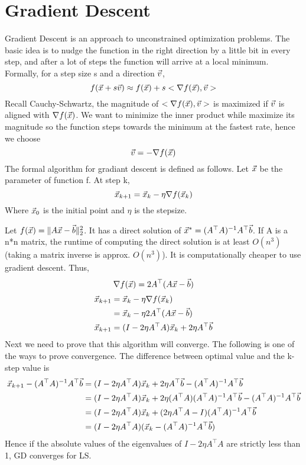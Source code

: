 \section{Gradient Descent} %
\label{sec:gradient_descent}

\begin{definition}
	Gradient Descent is an approach to unconstrained optimization problems. The basic idea is to nudge the function in the right direction by a little bit in every step, and after a lot of steps the function will arrive at a local minimum. Formally, for a step size s and a direction $\vec{v}$,
	\[
f(\vec{x}+s\vec{v}) \approx f(\vec{x})+s<\nabla f(\vec{x}), \vec{v}>
	\]
	Recall Cauchy-Schwartz, the magnitude of $<\nabla f(\vec{x}), \vec{v}>$ is maximized if $\vec{v}$ is aligned with $\nabla f(\vec{x})$. We want to minimize the inner product while maximize its magnitude so the function steps towards the minimum at the fastest rate, hence we choose
	\[
\vec{v} = -\nabla f(\vec{x})
	\]
	The formal algorithm for gradiant descent is defined as follows. Let $\vec{x}$ be the parameter of function f. At step k,
	\[
\vec{x}_{k+1} = \vec{x}_k -\eta\nabla f(\vec{x}_k)
	\]
	Where $\vec{x}_0$ is the initial point and $\eta$ is the stepsize.
\end{definition}

\begin{example}[GD on LS]
	Let $f(\vec{x}) = \|A\vec{x}-\vec{b}\|_2^2$. It has a direct solution of $\vec{x}^* = (A^\top A)^{-1}A^\top\vec{b}$. If A is a n*n matrix, the runtime of computing the direct solution is at least $O(n^3)$ (taking a matrix inverse is approx. $O(n^3)$). It is computationally cheaper to use gradient descent. Thus,
	\[
\nabla f(\vec{x}) = 2A^\top(A\vec{x}-\vec{b})
	\]
\begin{align*}
	\vec{x}_{k+1} &= \vec{x}_k -\eta\nabla f(\vec{x}_k)\\
	&= \vec{x}_k - \eta 2A^\top(A\vec{x}-\vec{b})\\
	\vec{x}_{k+1} &= (I-2\eta A^\top A)\vec{x}_k + 2\eta A^\top\vec{b}
\end{align*}
	Next we need to prove that this algorithm will converge. The following is one of the ways to prove convergence. The difference between optimal value and the k-step value is
	\begin{align*}
		\vec{x}_{k+1} - (A^\top A)^{-1}A^\top\vec{b} &= (I-2\eta A^\top A)\vec{x}_k + 2\eta A^\top\vec{b} - (A^\top A)^{-1}A^\top\vec{b}\\
		&= (I-2\eta A^\top A)\vec{x}_k + 2\eta(A^\top A)(A^\top A)^{-1}A^\top\vec{b}-(A^\top A)^{-1}A^\top\vec{b}\\
		&= (I-2\eta A^\top A)\vec{x}_k + (2\eta A^\top A-I)(A^\top A)^{-1}A^\top\vec{b}\\
		&= (I-2\eta A^\top A)(\vec{x}_k - (A^\top A)^{-1}A^\top\vec{b})
	\end{align*}
	Hence if the absolute values of the eigenvalues of $I-2\eta A^\top A$ are strictly less than 1, GD converges for LS.
\end{example}

